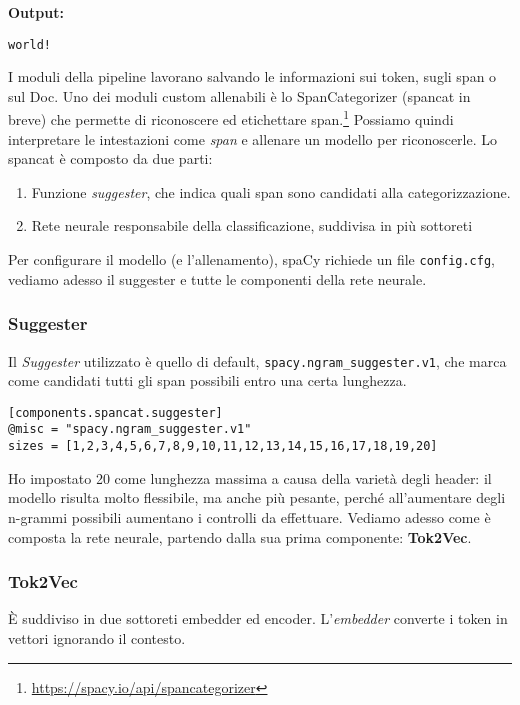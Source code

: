 \noindent \textbf{Output:}

\begin{lstlisting}[style=output]
world!
\end{lstlisting}

\noindent I moduli della pipeline lavorano salvando le informazioni sui token, sugli span o sul Doc. Uno dei moduli custom allenabili è lo SpanCategorizer (spancat in breve) che permette di riconoscere ed etichettare span.\footnote{\url{https://spacy.io/api/spancategorizer}} Possiamo quindi interpretare le intestazioni come \textit{span} e allenare un modello per riconoscerle. Lo spancat è composto da due parti:
\begin{enumerate}
    \item Funzione \textit{suggester}, che indica quali span sono candidati alla categorizzazione.
    \item Rete neurale responsabile della classificazione, suddivisa in più sottoreti
\end{enumerate}

\noindent Per configurare il modello (e l'allenamento), spaCy richiede un file \texttt{config.cfg}, vediamo adesso il suggester e tutte le componenti della rete neurale.
\subsubsection{Suggester}
Il \textit{Suggester} utilizzato è quello di default, \texttt{spacy.ngram\_suggester.v1}, che marca come candidati tutti gli span possibili entro una certa lunghezza.

\begin{lstlisting}[style=cmd]
[components.spancat.suggester]
@misc = "spacy.ngram_suggester.v1"
sizes = [1,2,3,4,5,6,7,8,9,10,11,12,13,14,15,16,17,18,19,20]
\end{lstlisting}

\noindent Ho impostato 20 come lunghezza massima a causa della varietà degli header: il modello risulta molto flessibile, ma anche più pesante, perché all'aumentare degli n-grammi possibili aumentano i controlli da effettuare.
Vediamo adesso come è composta la rete neurale, partendo dalla sua prima componente: \textbf{Tok2Vec}.
\subsubsection{Tok2Vec}
\noindent È suddiviso in due sottoreti embedder ed encoder. L'\textit{embedder} converte i token in vettori ignorando il contesto.

